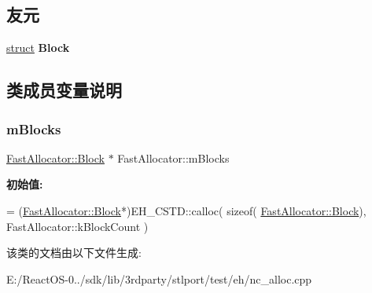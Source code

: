 \subsection*{友元}
\begin{DoxyCompactItemize}
\item 
\mbox{\label{class_fast_allocator_af38287fd339032a36d09967eff6f7133}} 
\hyperlink{interfacestruct}{struct} {\bfseries Block}
\end{DoxyCompactItemize}


\subsection{类成员变量说明}
\mbox{\label{class_fast_allocator_a2b2c1a90566161832babd27ce0eafcfd}} 
\subsubsection{\texorpdfstring{m\+Blocks}{mBlocks}}
{\footnotesize\ttfamily \hyperlink{struct_fast_allocator_1_1_block}{Fast\+Allocator\+::\+Block} $\ast$ Fast\+Allocator\+::m\+Blocks\hspace{0.3cm}{\ttfamily [static]}}

{\bfseries 初始值\+:}
\begin{DoxyCode}
=
(\hyperlink{struct_fast_allocator_1_1_block}{FastAllocator::Block}*)EH\_CSTD::calloc( \textcolor{keyword}{sizeof}(
      \hyperlink{struct_fast_allocator_1_1_block}{FastAllocator::Block}), FastAllocator::kBlockCount )
\end{DoxyCode}


该类的文档由以下文件生成\+:\begin{DoxyCompactItemize}
\item 
E\+:/\+React\+O\+S-\/0../sdk/lib/3rdparty/stlport/test/eh/nc\+\_\+alloc.\+cpp\end{DoxyCompactItemize}
